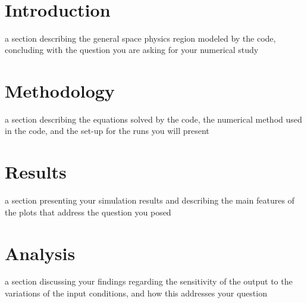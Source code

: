 \documentclass[12pt, letterpaper]{article}
\begin{document}
\noindent \normalsize{} \\[0.125cm]
\noindent \normalsize{} \\[0.125cm]
\noindent \normalsize{} \\[0.125cm]
\noindent \normalsize{} \\

\section{Introduction}
\label{sec:1}
a section describing the general space physics region modeled by the code,
concluding with the question you are asking for your numerical study

\section{Methodology}
\label{sec:2}
a section describing the equations solved by the code, the numerical
method used in the code, and the set-up for the runs you will present

\section{Results}
\label{sec:3}
a section presenting your simulation results and describing the main features of
the plots that address the question you posed

\section{Analysis}
\label{sec:4}
a section discussing your findings regarding the sensitivity of the output to the
variations of the input conditions, and how this addresses your question
\end{document}

